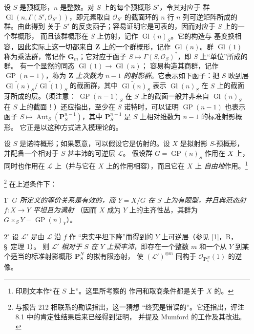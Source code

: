 设 $S$ 是预概形，$n$ 是整数。对 $S$ 上的每个预概形 $S'$，令其对应于
群 $\operatorname{Gl}(n,\Gamma(S',\mathcal O_{S'}))$，即元素取自
$\mathcal O_{S'}$ 的截面环的 $n$ 行 $n$ 列可逆矩阵所成的群。由此得到
关于 $S'$ 的反变函子；容易证明它是可表的，因而对应于 $S$ 上的一个群概形，
而且该群概形在 $S$ 上仿射，记作 $\operatorname{Gl}(n)_S$。它的构造与
基变换相容，因此实际上这一切都来自 $\mathbf Z$ 上的一个群概形，记作
$\operatorname{Gl}(n)$。群 $\operatorname{Gl}(1)$ 称为乘法群，常记作
$\mathbf G_m$；它对应于函子
$S\longmapsto\Gamma(S,\mathcal O_S)^*$，即 $S$ 上“单位”所成的群。
有一个显然的同态 $\operatorname{Gl}(1)\to\operatorname{Gl}(n)$；
容易构造其商群，记作 $\operatorname{GP}(n-1)$，称为
\emph{$\mathbf Z$ 上次数为 $n-1$ 的射影群}。它表示如下函子：把 $S$
映到层
$\widetilde{\operatorname{Gl}(n)}_S/
\widetilde{\operatorname{Gl}(1)}_S$ 的截面群，其中
$\widetilde{\operatorname{Gl}(n)}_S$ 表示
$\operatorname{Gl}(n)_S$ 在 $S$ 上的截面芽所成的层。（须注意：
$\operatorname{GP}(n-1)_S$ 在 $S$ 上的截面一般并非来自
$\operatorname{Gl}(n)_S$ 在 $S$ 上的截面！）还应指出，至少在 $S$
诺特时，可以证明 $\operatorname{GP}(n-1)$ 也表示函子
$S\longmapsto\operatorname{Aut}_S(\mathbf P_S^{n-1})$，其中
$\mathbf P_S^{n-1}$ 是 $S$ 上相对维数为 $n-1$ 的标准射影概形。
它正是以这种方式进入模理论的。

设 $S$ 是诺特概形；如果愿意，可以假设它是仿射的。设 $X$ 是拟射影
$S$-预概形，并配备一个相对于 $S$ 甚丰沛的可逆层 $\mathcal L$。
假设群 $G=\operatorname{GP}(n)_S$ 作用在 $X$ 上，同时也作用在
$\mathcal L$ 上（并与它在 $X$ 上的作用相容），而且它在 $X$ 上
\emph{自由地}作用。\footnote{印刷文本作“在 $S$ 上”。这里所考察的
作用和取商条件都是关于 $X$ 的。}

\footnote{与报告 212 相联系的勘误指出，这一猜想
“终究是错误的”。它还指出，评注 8.1 中的肯定性结果后来已经得到证明，
并提及 Mumford 的工作及其改进。} 在上述条件下：

\smallskip
\noindent $1^\circ$ \emph{$G$ 所定义的等价关系是有效的，商
$Y=X/G$ 在 $S$ 上为有限型，并且典范态射 $f:X\to Y$ 平坦且为满射}
（因而 $X$ 成为 $Y$ 上的主齐性丛，其群为
$G\times_S Y=\operatorname{GP}(n)_Y$）。

\smallskip
\noindent $2^\circ$ 设 $\mathcal L'$ 是由 $\mathcal L$ 沿 $f$ 作
“忠实平坦下降”而得到的 $Y$ 上可逆层（参见 [1]，B，\S~定理 1）。
则 $\mathcal L'$ \emph{相对于 $S$ 在 $Y$ 上预丰沛}，即存在一个整数
$m$ 和一个从 $Y$ 到某个适当的标准射影概形 $\mathbf P_S^N$ 的拟有限态射，
使 $(\mathcal L')^{\otimes m}$ 同构于
$\mathcal O_{\mathbf P_S^N}(1)$ 的逆像。

